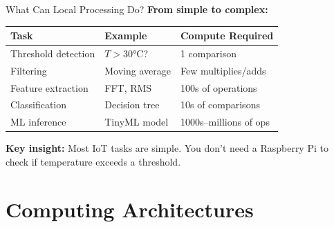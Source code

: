 \documentclass[aspectratio=169,11pt]{beamer}
\begin{document}
\begin{frame}{What Can Local Processing Do?}
    \textbf{From simple to complex:}
    
    \vspace{0.3cm}
    \begin{table}
        \centering
        \small
        \begin{tabular}{@{}p{3.5cm}p{4cm}p{5cm}@{}}
            \toprule
            \textbf{Task} & \textbf{Example} & \textbf{Compute Required} \\
            \midrule
            Threshold detection & $T > 30$°C? & 1 comparison \\
            \addlinespace
            Filtering & Moving average & Few multiplies/adds \\
            \addlinespace
            Feature extraction & FFT, RMS & 100s of operations \\
            \addlinespace
            Classification & Decision tree & 10s of comparisons \\
            \addlinespace
            ML inference & TinyML model & 1000s--millions of ops \\
            \bottomrule
        \end{tabular}
    \end{table}
    
    \vspace{0.3cm}
    \textbf{Key insight:} Most IoT tasks are simple. You don't need a Raspberry Pi to check if temperature exceeds a threshold.
\end{frame}

\section{Computing Architectures}
\end{document}
